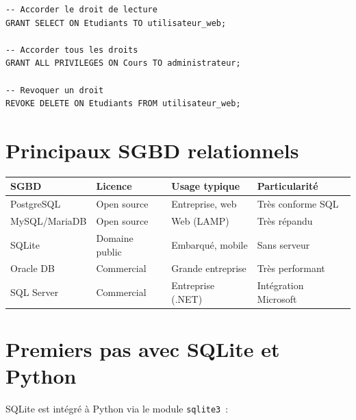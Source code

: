 \begin{codeblock}[title=\textbf{Gestion des droits (PostgreSQL)}]
\begin{verbatim}
-- Accorder le droit de lecture
GRANT SELECT ON Etudiants TO utilisateur_web;

-- Accorder tous les droits
GRANT ALL PRIVILEGES ON Cours TO administrateur;

-- Revoquer un droit
REVOKE DELETE ON Etudiants FROM utilisateur_web;
\end{verbatim}
\end{codeblock}

\section{Principaux SGBD relationnels}

\begin{center}
\begin{tabular}{llll}
\toprule
\textbf{SGBD} & \textbf{Licence} & \textbf{Usage typique} & \textbf{Particularit\'e} \\
\midrule
PostgreSQL & Open source & Entreprise, web & Tr\`es conforme SQL \\
MySQL/MariaDB & Open source & Web (LAMP) & Tr\`es r\'epandu \\
SQLite & Domaine public & Embarqu\'e, mobile & Sans serveur \\
Oracle DB & Commercial & Grande entreprise & Tr\`es performant \\
SQL Server & Commercial & Entreprise (.NET) & Int\'egration Microsoft \\
\bottomrule
\end{tabular}
\end{center}

\section{Premiers pas avec SQLite et Python}

SQLite est int\'egr\'e \`a Python via le module \texttt{sqlite3}~:

